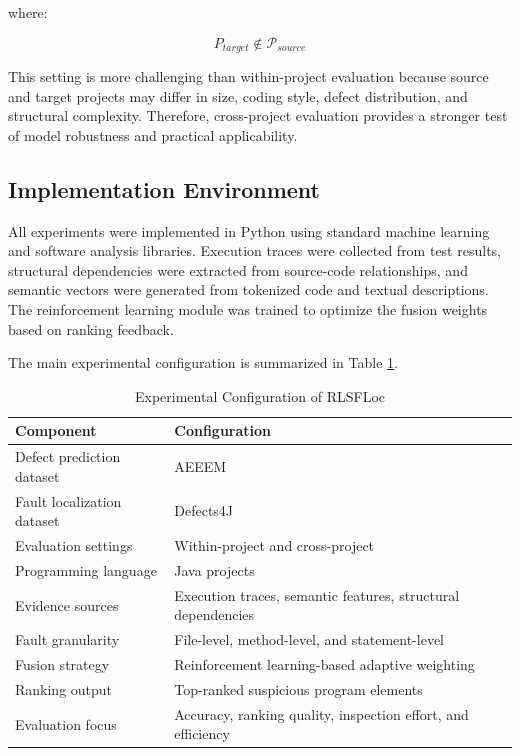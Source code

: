 \documentclass[article,article,submit,pdftex,moreauthors]{Definitions/mdpi}
\begin{document}
where:

\begin{equation}
P_{target} \notin \mathcal{P}_{source}
\end{equation}

This setting is more challenging than within-project evaluation because source and target projects may differ in size, coding style, defect distribution, and structural complexity. Therefore, cross-project evaluation provides a stronger test of model robustness and practical applicability.

\subsection{Implementation Environment}

All experiments were implemented in Python using standard machine learning and software analysis libraries. Execution traces were collected from test results, structural dependencies were extracted from source-code relationships, and semantic vectors were generated from tokenized code and textual descriptions. The reinforcement learning module was trained to optimize the fusion weights based on ranking feedback.

The main experimental configuration is summarized in Table \ref{tab:experimental_configuration}.

\begin{table}[H]
\caption{Experimental Configuration of RLSFLoc}
\label{tab:experimental_configuration}
\centering
\renewcommand{\arraystretch}{1.15}
\begin{tabular}{l l}
\hline
\textbf{Component} & \textbf{Configuration} \\
\hline
Defect prediction dataset & AEEEM \\
Fault localization dataset & Defects4J \\
Evaluation settings & Within-project and cross-project \\
Programming language & Java projects \\
Evidence sources & Execution traces, semantic features, structural dependencies \\
Fault granularity & File-level, method-level, and statement-level \\
Fusion strategy & Reinforcement learning-based adaptive weighting \\
Ranking output & Top-ranked suspicious program elements \\
Evaluation focus & Accuracy, ranking quality, inspection effort, and efficiency \\
\hline
\end{tabular}
\end{table}
\end{document}

